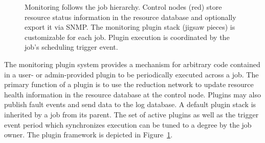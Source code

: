 \begin{figure}
\begin{minipage}[b]{0.4\linewidth}
\end{minipage}
\hspace{1cm}
\begin{minipage}[b]{0.4\linewidth}
\end{minipage}
\caption{Monitoring follows the job hierarchy.
Control nodes (red) store resource status information in the resource
database and optionally export it via SNMP.
The monitoring plugin stack (jigsaw pieces) is customizable for each job.
Plugin execution is coordinated by the job's scheduling trigger event.}
\label{FigMonEx1}
\end{figure}

The monitoring plugin system provides a mechanism for arbitrary code 
contained in a user- or admin-provided plugin to be periodically
executed across a job.
The primary function of a plugin is to use the reduction network to update
resource health information in the resource database at the control node.
Plugins may also publish fault events and send data to the log database.
A default plugin stack is inherited by a job from its parent.
The set of active plugins as well as the trigger event period
which synchronizes execution can be tuned to a degree by the job owner.
The plugin framework is depicted in Figure~\ref{FigMonEx1}.


